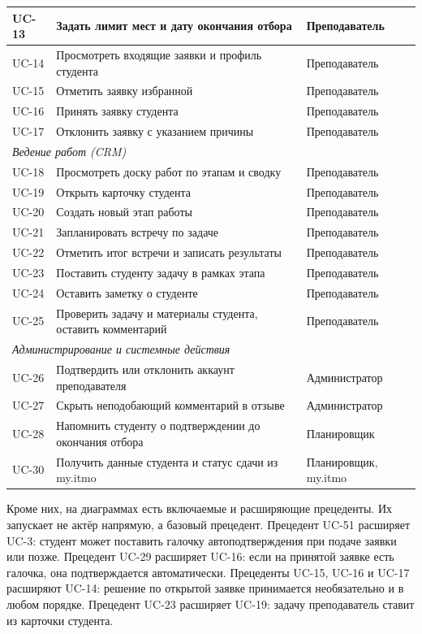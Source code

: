 \documentclass[a4paper,12pt]{article}
\begin{document}
\begin{center}
\begin{longtable}{|l|p{9.6cm}|p{2.9cm}|}
UC-13 & Задать лимит мест и дату окончания отбора & Преподаватель\\ \hline
UC-14 & Просмотреть входящие заявки и профиль студента & Преподаватель\\ \hline
UC-15 & Отметить заявку избранной & Преподаватель\\ \hline
UC-16 & Принять заявку студента & Преподаватель\\ \hline
UC-17 & Отклонить заявку с указанием причины & Преподаватель\\ \hline
\multicolumn{3}{|l|}{\textit{Ведение работ (CRM)}}\\ \hline
UC-18 & Просмотреть доску работ по этапам и сводку & Преподаватель\\ \hline
UC-19 & Открыть карточку студента & Преподаватель\\ \hline
UC-20 & Создать новый этап работы & Преподаватель\\ \hline
UC-21 & Запланировать встречу по задаче & Преподаватель\\ \hline
UC-22 & Отметить итог встречи и записать результаты & Преподаватель\\ \hline
UC-23 & Поставить студенту задачу в рамках этапа & Преподаватель\\ \hline
UC-24 & Оставить заметку о студенте & Преподаватель\\ \hline
UC-25 & Проверить задачу и материалы студента, оставить комментарий & Преподаватель\\ \hline
\multicolumn{3}{|l|}{\textit{Администрирование и системные действия}}\\ \hline
UC-26 & Подтвердить или отклонить аккаунт преподавателя & Администратор\\ \hline
UC-27 & Скрыть неподобающий комментарий в отзыве & Администратор\\ \hline
UC-28 & Напомнить студенту о подтверждении до окончания отбора & Планировщик\\ \hline
UC-30 & Получить данные студента и статус сдачи из my.itmo & Планировщик, my.itmo\\ \hline
\end{longtable}
\end{center}

Кроме них, на диаграммах есть включаемые и расширяющие прецеденты. Их запускает не актёр напрямую, а базовый прецедент. Прецедент UC-51 расширяет UC-3: студент может поставить галочку автоподтверждения при подаче заявки или позже. Прецедент UC-29 расширяет UC-16: если на принятой заявке есть галочка, она подтверждается автоматически. Прецеденты UC-15, UC-16 и UC-17 расширяют UC-14: решение по открытой заявке принимается необязательно и в любом порядке. Прецедент UC-23 расширяет UC-19: задачу преподаватель ставит из карточки студента.
\end{document}
